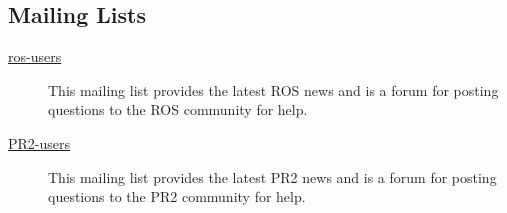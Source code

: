 \subsection{Mailing Lists}
\begin{description}
\item[\href{https://lists.sourceforge.net/lists/listinfo/ros-users}{ros-users}] This mailing list 
provides the latest ROS news and is a forum for posting questions to the ROS community for help. 
\item[\href{http://lists.willowgarage.com/cgi-bin/mailman/listinfo/pr2-users}{PR2-users}] This 
mailing list provides the latest PR2 news and is a forum for posting questions to the PR2 community 
for help.
\end{description}


